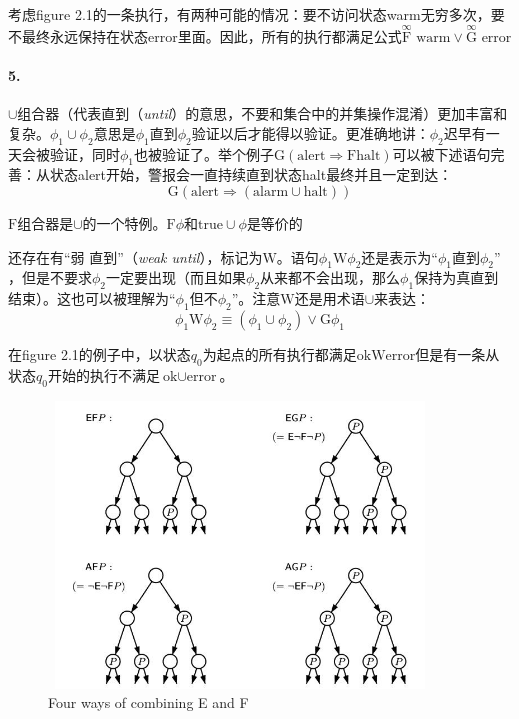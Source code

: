 \documentclass{book}
\begin{document}
    考虑figure 2.1的一条执行，有两种可能的情况：要不访问状态warm无穷多次，要不最终永远保持在状态error里面。因此，所有的执行都满足公式$\overset{\infty}{\mathrm{F}}\text{ warm} \vee \overset{\infty}{\mathrm{G}} \text{ error}$

    \paragraph{5.} $\cup$组合器（代表直到（{\itshape until}）的意思，不要和集合中的并集操作混淆）更加丰富和复杂。$\phi_1 \cup \phi_2$意思是$\phi_1$直到$\phi_2$验证以后才能得以验证。更准确地讲：$\phi_2$迟早有一天会被验证，同时$\phi_1$也被验证了。举个例子$\mathrm{G}(\text{alert} \Rightarrow \mathrm{F} \text{halt})$可以被下述语句完善：从状态alert开始，警报会一直持续直到状态halt最终并且一定到达：
    \begin{equation*}
      \mathrm{G}(\text{alert} \Rightarrow ( \text{alarm}\cup \text{halt}) )
    \end{equation*}

    $\mathrm{F}$组合器是$\cup$的一个特例。$\mathrm{F}\phi$和$\text{true}\cup\phi$是等价的

    还存在有“弱 直到”（{\itshape weak until}），标记为$\mathrm{W}$。语句$\phi_1\mathrm{W}\phi_2$还是表示为“$\phi_1\text{直到}\phi_2”$，但是不要求$\phi_2$一定要出现（而且如果$\phi_2$从来都不会出现，那么$\phi_1$保持为真直到结束）。这也可以被理解为“$\phi_1$但不$\phi_2$”。注意$\mathrm{W}$还是用术语$\cup$来表达：
    \begin{equation*}
      \phi_1\mathrm{W}\phi_2 \equiv (\phi_1\cup\phi_2) \vee \mathrm{G}\phi_1
    \end{equation*}

    在figure 2.1的例子中，以状态$q_0$为起点的所有执行都满足$\text{ok}\mathrm{W}\text{error}$但是有一条从状态$q_0$开始的执行不满足$\text{ok}\cup\text{error}$。
    \begin{figure}
        \centering
        \includegraphics[width=4.0in,height=3.0in]{2_2.jpg}
        \caption{Four ways of combining E and F}
    \end{figure}
\end{document}
